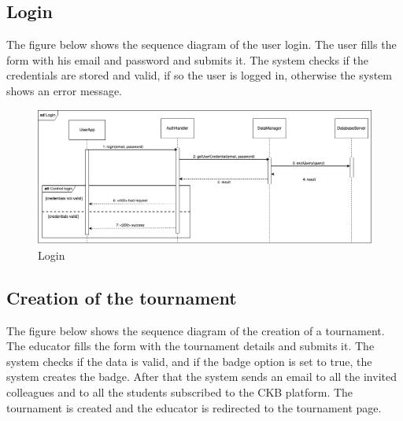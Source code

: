 \subsection{Login}
The figure below shows the sequence diagram of the user login. The user fills the form with his email and password and submits it. 
The system checks if the credentials are stored and valid, if so the user is logged in, otherwise the system shows an error message.\\
\begin{figure}[H]
    \centering
    \includegraphics[width=1\textwidth]{images/seq_diagrams/Login_DD.png}
    \caption{Login}
\end{figure}
\clearpage

\subsection{Creation of the tournament}
The figure below shows the sequence diagram of the creation of a tournament. The educator fills the form
 with the tournament details and submits it. The system checks if the data is valid, and if the badge option is set to true, the system creates the badge.
 After that the system sends an email to all the invited colleagues and to all the students subscribed to the CKB platform. 
 The tournament is created and the educator is redirected to the tournament page.\\

